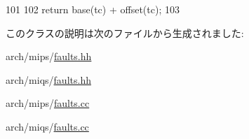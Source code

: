 \begin{DoxyCode}
101     {
102         return base(tc) + offset(tc);
103     }
\end{DoxyCode}


このクラスの説明は次のファイルから生成されました:\begin{DoxyCompactItemize}
\item 
arch/mips/\hyperlink{arch_2mips_2faults_8hh}{faults.hh}\item 
arch/miqs/\hyperlink{arch_2miqs_2faults_8hh}{faults.hh}\item 
arch/mips/\hyperlink{arch_2mips_2faults_8cc}{faults.cc}\item 
arch/miqs/\hyperlink{arch_2miqs_2faults_8cc}{faults.cc}\end{DoxyCompactItemize}
